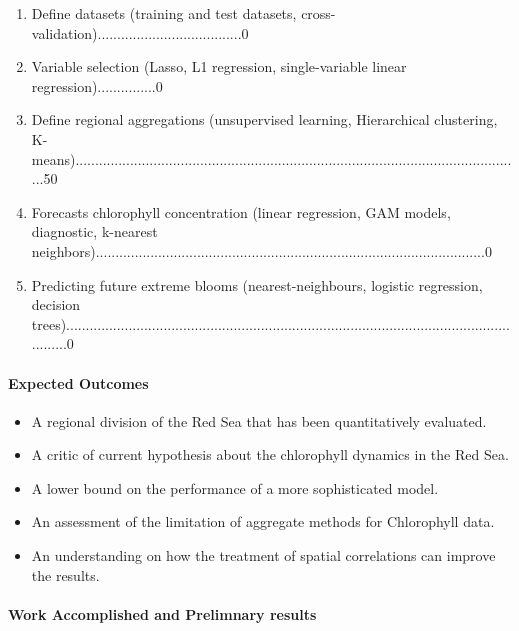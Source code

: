 \begin{enumerate}
\item Define datasets (training and test datasets, cross-validation).....................................0%
\item Variable selection (Lasso, L1 regression, single-variable linear regression)...............0%
\item Define regional aggregations (unsupervised learning, Hierarchical clustering, K-means)...................................................................................................................50%
\item Forecasts chlorophyll concentration (linear regression, GAM models, diagnostic, k-nearest neighbors)....................................................................................................0%
\item Predicting future extreme blooms (nearest-neighbours, logistic regression, decision trees)...........................................................................................................................0%
\end{enumerate}

\paragraph{Expected Outcomes}

\begin{itemize}
\item A regional division of the Red Sea that has been quantitatively evaluated.
\item A critic of current hypothesis about the chlorophyll dynamics in the Red Sea.
\item A lower bound on the performance of a more sophisticated model.
\item An assessment of the limitation of aggregate methods for Chlorophyll data.
\item An understanding on how the treatment of spatial correlations can improve the results.
\end{itemize}

\paragraph{Work Accomplished and Prelimnary results}
